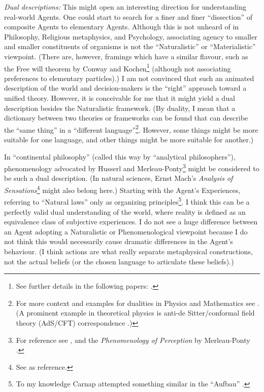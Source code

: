 \documentclass{article}
\begin{document}
{\it Dual descriptions:}
This might open an interesting direction for understanding real-world Agents. One could start to search for a finer and finer ``dissection'' of composite Agents to elementary Agents. Although this is not unheard of in Philosophy, Religious metaphysics, and Psychology, associating agency to smaller and smaller constituents of organisms is not the ``Naturalistic'' or ``Materialistic'' viewpoint.
(There are, however, framings which have a similar flavour, such as the Free will theorem by Conway and Kochen\footnote{See further details in the following papers: \cite{paper:ConwayKochen2006,arxiv:ConwayKochen2008}.} (although not associating preferences to elementary particles).)
I am not convinced that such an animated description of the world and decision-makers is the ``right'' approach toward a unified theory. However, it is conceivable for me that it might yield a dual description besides the Naturalistic framework. (By duality, I mean that a dictionary between two theories or frameworks can be found that can describe the ``same thing'' in a ``different language''\footnote{For more context and examples for dualities in Physics and Mathematics see \cite{nlab:Duality}. (A prominent example in theoretical physics is anti-de Sitter/conformal field theory (AdS/CFT) correspondence \cite{arxiv:Polchinski2015Dualities,paper:AdS/CFTIntegrability}.)}. However, some things might be more suitable for one language, and other things might be more suitable for another.)

In ``continental philosophy'' (called this way by ``analytical philosophers''), phenomenology advocated by Husserl and Merleau-Ponty\footnote{For reference see \cite{sep:Phenomenology}, and the \emph{Phenomenology of Perception} by Merleau-Ponty \cite{book:PhenomenologyOfPerception}.} might be considered to be such a dual description. (In natural sciences, Ernst Mach’s \emph{Analysis of Sensations}\footnote{See \cite{sep:ErnstMach,book:AnalysisOfSensations} as reference.} might also belong here.) Starting with the Agent's Experiences, referring to ``Natural laws'' only as organizing principles\footnote{To my knowledge Carnap attempted something similar in the ``Aufbau'' \cite{book:CarnapAufbau}.}. I think this can be a perfectly valid dual understanding of the world, where reality is defined as an equivalence class of subjective experiences.
I do not see a huge difference between an Agent adopting a Naturalistic or Phenomenological viewpoint because I do not think this would necessarily cause dramatic differences in the Agent’s behaviour.
(I think actions are what really separate metaphysical constructions, not the actual beliefs (or the chosen language to articulate these beliefs).)
\end{document}
